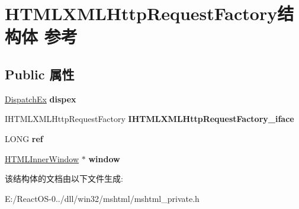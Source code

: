 \hypertarget{struct_h_t_m_l_x_m_l_http_request_factory}{}\section{H\+T\+M\+L\+X\+M\+L\+Http\+Request\+Factory结构体 参考}
\label{struct_h_t_m_l_x_m_l_http_request_factory}
\subsection*{Public 属性}
\begin{DoxyCompactItemize}
\item 
\mbox{\label{struct_h_t_m_l_x_m_l_http_request_factory_add297f0a5c36119dac3844cacbeb1f8b}} 
\hyperlink{struct_dispatch_ex}{Dispatch\+Ex} {\bfseries dispex}
\item 
\mbox{\label{struct_h_t_m_l_x_m_l_http_request_factory_a30d4518b159abceecffd12111dca2316}} 
I\+H\+T\+M\+L\+X\+M\+L\+Http\+Request\+Factory {\bfseries I\+H\+T\+M\+L\+X\+M\+L\+Http\+Request\+Factory\+\_\+iface}
\item 
\mbox{\label{struct_h_t_m_l_x_m_l_http_request_factory_abaea05573ba5b100eed213eb4aa70d1c}} 
L\+O\+NG {\bfseries ref}
\item 
\mbox{\label{struct_h_t_m_l_x_m_l_http_request_factory_aba89761267aeb10f69632c1b66affb29}} 
\hyperlink{struct_h_t_m_l_inner_window}{H\+T\+M\+L\+Inner\+Window} $\ast$ {\bfseries window}
\end{DoxyCompactItemize}


该结构体的文档由以下文件生成\+:\begin{DoxyCompactItemize}
\item 
E\+:/\+React\+O\+S-\/0../dll/win32/mshtml/mshtml\+\_\+private.\+h\end{DoxyCompactItemize}
